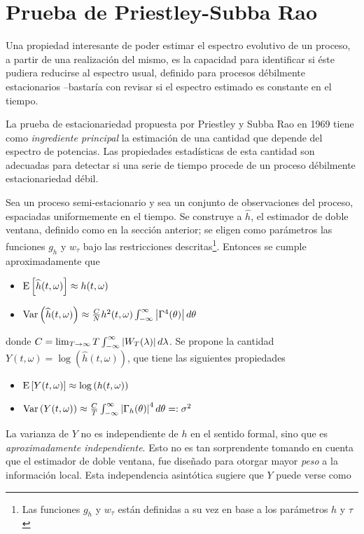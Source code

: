 \section{Prueba de Priestley-Subba Rao}



Una propiedad interesante de poder estimar el espectro evolutivo de un proceso, a partir de una 
realización del mismo, es la capacidad para identificar si éste pudiera reducirse al espectro 
usual, definido para procesos débilmente estacionarios --bastaría con revisar si el espectro 
estimado es constante en el tiempo.

La prueba de estacionariedad propuesta por Priestley y Subba Rao en 1969 \cite{Priestley69} tiene 
como \textit{ingrediente principal} la estimación de una cantidad que depende del espectro de
potencias. Las propiedades estadísticas de esta cantidad son adecuadas para detectar si una serie
de tiempo procede de un proceso débilmente estacionariedad débil.

Sea \xt un proceso semi-estacionario y sea \xtd un conjunto de observaciones del proceso, 
espaciadas uniformemente en el tiempo.
Se construye a $\widehat{h}$, el estimador de doble ventana, definido como en la sección anterior;
se eligen como parámetros las funciones $g_h$ y $w_\tau$ bajo las restricciones 
descritas\footnote{Las funciones $g_h$ y $w_{\tau}$ están definidas a su vez en base a los 
parámetros $h$ y $\tau$}.
Entonces se cumple aproximadamente que
%
\begin{itemize}
\item $\mathrm{E}\left[ \widehat{h}(t,\omega) \right] \approx h(t,\omega)$
\item $\mathrm{Var}\left( \widehat{h}(t,\omega) \right) \approx 
\frac{C}{N} h^{2}(t,\omega) \int_{-\infty}^{\infty} \left| \Gamma^{4}(\theta) \right| d\theta$
\end{itemize}
%
donde $C = \lim_{T\rightarrow \infty} T \int_{-\infty}^{\infty} \left| W_T(\lambda) \right| d\lambda$.
Se propone la cantidad $Y(t,\omega) = \log\left(\widehat{h}(t,\omega)\right)$, que tiene 
las siguientes propiedades
%
\begin{itemize}
\item $\mathrm{E}\left[ Y(t,\omega) \right] \approx \log\left(h(t,\omega)\right)$
\item $\mathrm{Var}\left( Y(t,\omega) \right) \approx 
\frac{C}{T} \int_{-\infty}^{\infty} \left| \Gamma_h(\theta) \right|^{4} d\theta =: \sigma^{2}$
\end{itemize}
%

La varianza de $Y$ no es independiente de $h$ en el sentido formal, sino que es 
\textit{aproximadamente independiente}.
Esto no es tan sorprendente tomando en cuenta que el estimador de doble ventana, fue diseñado para 
otorgar mayor \textit{peso} a la información local. Esta independencia asintótica sugiere que $Y$ 
puede verse como

